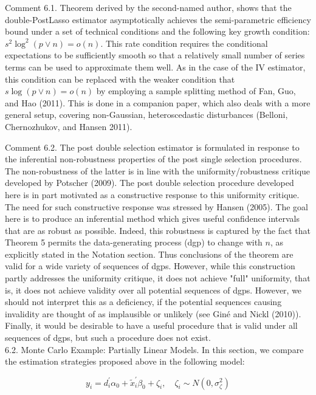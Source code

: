 \documentclass[10pt]{article}
\begin{document}
Comment 6.1. Theorem derived by the second-named author, shows that the double-PostLasso estimator asymptotically achieves the semi-parametric efficiency bound under a set of technical conditions and the following key growth condition: \(s^{2} \log ^{2}(p \vee n)=o(n)\). This rate condition requires the conditional expectations to be sufficiently smooth so that a relatively small number of series terms can be used to approximate them well. As in the case of the IV estimator, this condition can be replaced with the weaker condition that \(s \log (p \vee n)=o(n)\) by employing a sample splitting method of Fan, Guo, and Hao (2011). This is done in a companion paper, which also deals with a more general setup, covering non-Gaussian, heteroscedastic disturbances (Belloni, Chernozhukov, and Hansen 2011).

Comment 6.2. The post double selection estimator is formulated in response to the inferential non-robustness properties of the post single selection procedures. The non-robustness of the latter is in line with the uniformity/robustness critique developed by Potscher (2009). The post double selection procedure developed here is in part motivated as a constructive response to this uniformity critique. The need for such constructive response was stressed by Hansen (2005). The goal here is to produce an inferential method which gives useful confidence intervals that are as robust as possible. Indeed, this robustness is captured by the fact that Theorem 5 permits the data-generating process (dgp) to change with \(n\), as explicitly stated in the Notation section. Thus conclusions of the theorem are valid for a wide variety of sequences of dgps. However, while this construction partly addresses the uniformity critique, it does not achieve "full" uniformity, that is, it does not achieve validity over all potential sequences of dgps. However, we should not interpret this as a deficiency, if the potential sequences causing invalidity are thought of as implausible or unlikely (see Giné and Nickl (2010)). Finally, it would be desirable to have a useful procedure that is valid under all sequences of dgps, but such a procedure does not exist.\\
6.2. Monte Carlo Example: Partially Linear Models. In this section, we compare the estimation strategies proposed above in the following model:

\[
y_{i}=d_{i}^{\prime} \alpha_{0}+\tilde{x}_{i}^{\prime} \beta_{0}+\zeta_{i}, \quad \zeta_{i} \sim N\left(0, \sigma_{\zeta}^{2}\right)
\]
\end{document}
